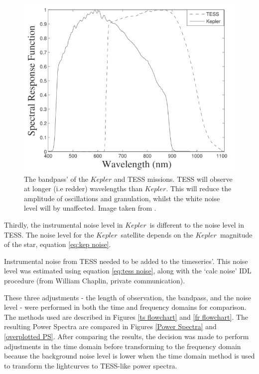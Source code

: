 \documentclass[a4paper,fleqn,usenatbib,useAMS]{mnras}
\newcommand{\kep}{\ensuremath{Kepler}\:}
\begin{document}
\begin{figure}
	\centering
	\includegraphics[scale=0.4]{bandpass.png}
	\caption{The bandpass' of the $Kepler$ and TESS missions. TESS will observe at longer (i.e redder) wavelengths than $Kepler$. This will reduce the amplitude of oscillations and granulation, whilst the white noise level will by unaffected. Image taken from \citet{placek_combining_2016}.}	
	\label{bandpass}
\end{figure} 

Thirdly, the instrumental noise level in \kep \ is different to the noise level in TESS. The noise level for the \kep \ satellite depends on the \kep \ magnitude of the star, equation \ref{eq:kep noise}.

Instrumental noise from TESS needed to be added to the timeseries'. This noise level was estimated using equation \ref{eq:tess noise}, along with the `calc noise' IDL procedure (from William Chaplin, private communication).

These three adjustments - the length of observation, the bandpass, and the noise level - were performed in both the time and frequency domains for comparison. The methods used are described in Figures \ref{ts flowchart} and \ref{fr flowchart}. The resulting Power Spectra are compared in Figures \ref{Power Spectra} and \ref{overplotted PS}. After comparing the results, the decision was made to perform adjustments in the time domain before transforming to the frequency domain because the background noise level is lower when the time domain method is used to transform the lightcurves to TESS-like power spectra. 
\end{document}
